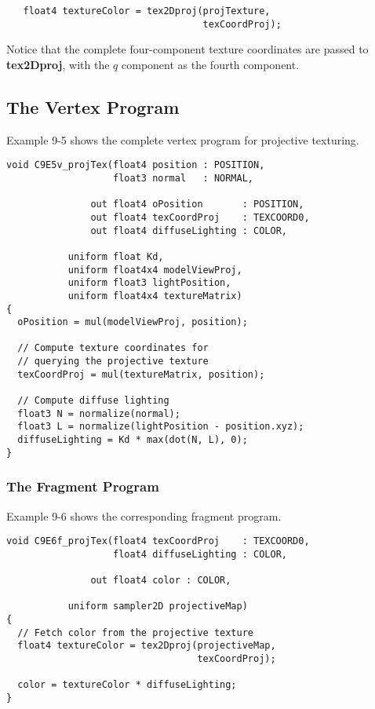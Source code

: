 \documentclass[../main.tex]{subfiles}
\begin{document}
\FloatBarrier
\begin{lstlisting}   
   float4 textureColor = tex2Dproj(projTexture,
                                   texCoordProj);
\end{lstlisting}
\FloatBarrier

Notice that the complete four-component texture coordinates are passed to \textbf{tex2Dproj}, with the $q$ component as the fourth component.

\subsection*{The Vertex Program}

Example 9-5 shows the complete vertex program for projective texturing.

\begin{lstlisting}[caption=Example 9-5. The \textbf{C9E5v_projTex} Vertex Program]
void C9E5v_projTex(float4 position : POSITION,
                   float3 normal   : NORMAL,

               out float4 oPosition       : POSITION,
               out float4 texCoordProj    : TEXCOORD0,
               out float4 diffuseLighting : COLOR,

           uniform float Kd,
           uniform float4x4 modelViewProj,
           uniform float3 lightPosition,
           uniform float4x4 textureMatrix)
{
  oPosition = mul(modelViewProj, position);

  // Compute texture coordinates for
  // querying the projective texture
  texCoordProj = mul(textureMatrix, position);

  // Compute diffuse lighting
  float3 N = normalize(normal);
  float3 L = normalize(lightPosition - position.xyz);
  diffuseLighting = Kd * max(dot(N, L), 0);
}
\end{lstlisting}

\subsubsection*{The Fragment Program}

Example 9-6 shows the corresponding fragment program.

\begin{lstlisting}[caption=Example 9-6. The \textbf{C9E6f_projTex} Fragment Program]
void C9E6f_projTex(float4 texCoordProj    : TEXCOORD0,
                   float4 diffuseLighting : COLOR,

               out float4 color : COLOR,

           uniform sampler2D projectiveMap)
{
  // Fetch color from the projective texture
  float4 textureColor = tex2Dproj(projectiveMap,
                                  texCoordProj);

  color = textureColor * diffuseLighting;
}
\end{lstlisting}
\end{document}
